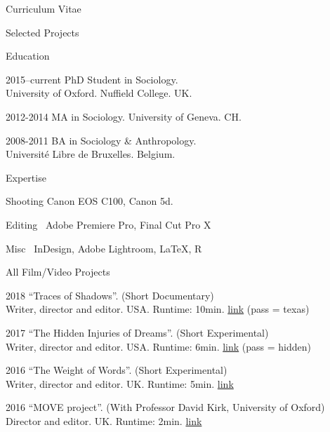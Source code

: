 \documentclass[12pt,a4paper]{article}
\newcommand*{\ac}[1]{\mbox{#1}}
\begin{document}
\begin{cv}{Curriculum Vitae}
\begin{cvlist}{Selected Projects}
   \end{cvlist}
   
        
        \begin{cvlist}{Education}
        	\item[2015--current] PhD Student in Sociology. \\ University of Oxford. Nuffield College. UK. 
        	\item[2012-2014] MA in Sociology. University of Geneva. CH. 
        	\item[2008-2011] BA in Sociology \& Anthropology. \\ Universit{\'e} Libre de Bruxelles. Belgium. 
        \end{cvlist}
             
        \begin{cvlist}{\ac{Expertise}}
        	\item[Shooting]  Canon EOS C100, Canon 5d.
        	\item[Editing] Adobe Premiere Pro, Final Cut Pro X
        	\item[Misc] InDesign, Adobe Lightroom, \LaTeX, R
        \end{cvlist}
        
         \newpage
     
     \begin{cvlist}{All Film/Video Projects}
     	\footnotesize
     	
     	\item[2018] ``Traces of Shadows''. (Short Documentary)
     	\\ Writer, director and editor. USA. Runtime: 10min. 
      \href{https://vimeo.com/248001217} {link} {\tiny (pass = texas)}

     	\item[2017] ``The Hidden Injuries of Dreams''. (Short Experimental)
     	\\ Writer, director and editor. USA. Runtime: 6min. 
      \href{https://vimeo.com/269840950} {link} {\tiny (pass = hidden)}
     	
     	\item[2016] ``The Weight of Words''. (Short Experimental)
     	\\ Writer, director and editor. UK. Runtime: 5min. 
      \href{https://accountablepictures.tumblr.com/post/163641983960/soundtrack-available-at-more} {link}
     	
     	\item[2016] ``MOVE project''. (With Professor David Kirk, University of Oxford)
     		\\ Director and editor. UK. Runtime: 2min. 
        \href{https://vimeo.com/236493125} {link}
        

\end{cvlist}
\end{cv}
\end{document}
